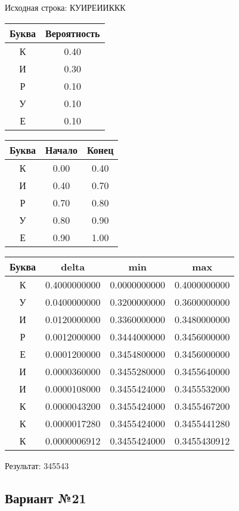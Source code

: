 \documentclass[a4paper, 12pt]{article}
\begin{document}
Исходная строка: КУИРЕИИККК\
\begin{center}
 \begin{tabular}{ |c|c| } 
  \hline
     Буква & Вероятность \\ \hline
К & 0.40\\\hline
И & 0.30\\\hline
Р & 0.10\\\hline
У & 0.10\\\hline
Е & 0.10
\\ \hline \end{tabular}
\end{center}
\begin{center}
 \begin{tabular}{ |c|c|c| } 
  \hline
     Буква & Начало & Конец \\ \hline
К & 0.00 & 0.40\\\hline
И & 0.40 & 0.70\\\hline
Р & 0.70 & 0.80\\\hline
У & 0.80 & 0.90\\\hline
Е & 0.90 & 1.00
\\ \hline \end{tabular}
\end{center}
\begin{center}
 \begin{tabular}{ |c|c|c|c| } 
  \hline
     Буква & delta & min & max \\ \hline
К & 0.4000000000 & 0.0000000000 & 0.4000000000\\\hline
У & 0.0400000000 & 0.3200000000 & 0.3600000000\\\hline
И & 0.0120000000 & 0.3360000000 & 0.3480000000\\\hline
Р & 0.0012000000 & 0.3444000000 & 0.3456000000\\\hline
Е & 0.0001200000 & 0.3454800000 & 0.3456000000\\\hline
И & 0.0000360000 & 0.3455280000 & 0.3455640000\\\hline
И & 0.0000108000 & 0.3455424000 & 0.3455532000\\\hline
К & 0.0000043200 & 0.3455424000 & 0.3455467200\\\hline
К & 0.0000017280 & 0.3455424000 & 0.3455441280\\\hline
К & 0.0000006912 & 0.3455424000 & 0.3455430912
\\ \hline \end{tabular}
\end{center}
Результат: 345543
\pagebreak
\subsection{Вариант №21}
\end{document}
